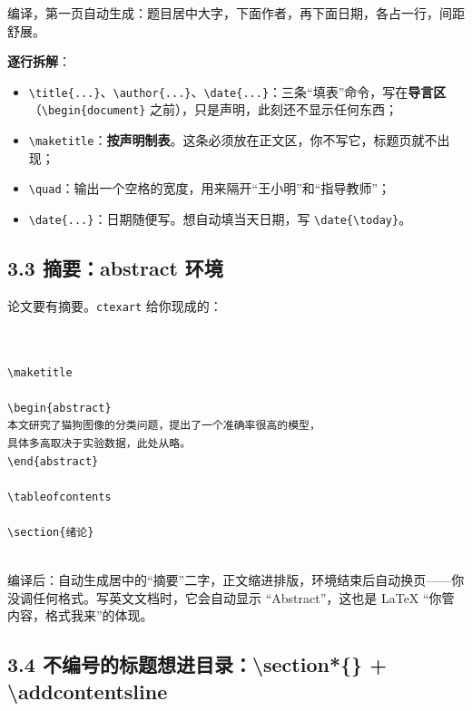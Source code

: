 编译，第一页自动生成：题目居中大字，下面作者，再下面日期，各占一行，间距舒展。

\textbf{逐行拆解}：

\begin{itemize}
\setlength{\itemsep}{2pt}
\item \texttt{\textbackslash{}title\{...\}}、\texttt{\textbackslash{}author\{...\}}、\texttt{\textbackslash{}date\{...\}}：三条“填表”命令，写在\textbf{导言区}（\texttt{\textbackslash{}begin\{document\}} 之前），只是声明，此刻还不显示任何东西；
\item \texttt{\textbackslash{}maketitle}：\textbf{按声明制表}。这条必须放在正文区，你不写它，标题页就不出现；
\item \texttt{\textbackslash{}quad}：输出一个空格的宽度，用来隔开“王小明”和“指导教师”；
\item \texttt{\textbackslash{}date\{...\}}：日期随便写。想自动填当天日期，写 \texttt{\textbackslash{}date\{\textbackslash{}today\}}。
\end{itemize}

\subsection*{3.3 摘要：abstract 环境}

论文要有摘要。\texttt{ctexart} 给你现成的：

\begin{lstlisting}


\maketitle

\begin{abstract}
本文研究了猫狗图像的分类问题，提出了一个准确率很高的模型，
具体多高取决于实验数据，此处从略。
\end{abstract}

\tableofcontents

\section{绪论}


\end{lstlisting}

编译后：自动生成居中的“摘要”二字，正文缩进排版，环境结束后自动换页——你没调任何格式。写英文文档时，它会自动显示 “Abstract”，这也是 LaTeX “你管内容，格式我来”的体现。

\subsection*{3.4 不编号的标题想进目录：\textbackslash{}section*\{\} + \textbackslash{}addcontentsline}


